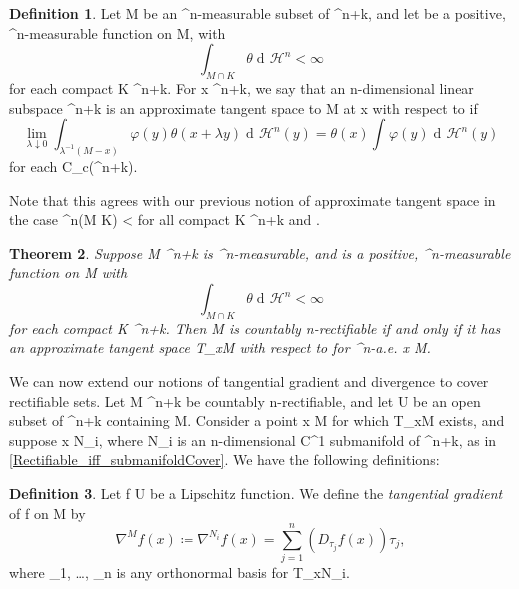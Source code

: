 \documentclass[a4paper, 11pt]{article}
\theoremstyle{plain}
\newtheorem{theorem}{Theorem}[section]
\theoremstyle{definition}
\newtheorem{definition}[theorem]{Definition}
\theoremstyle{remark}
\DeclareMathOperator{\diff}{d \!}
\numberwithin{equation}{subsection}
\def\({}
\def\){}
\def\pi{}
\begin{document}
\begin{definition}
Let \(M\) be an \(^{n}\)-measurable subset of \(^{n+k}\), and let \(\theta\) be a positive, \(^{n}\)-measurable function on \(M\), with
\begin{equation}
\int_{M \cap K} \theta \diff\mathcal{H}^{n}  < \infty
\end{equation} 
for each compact \(K \subset {}^{n+k}\). For \(x \in {}^{n+k}\), we say that an \(n\)-dimensional linear subspace \(\pi \subset {}^{n+k}\) is an approximate tangent space to \(M\) at \(x\) with respect to \(\theta\) if
\begin{equation}
\lim_{\lambda \downarrow 0} \int_{\lambda^{-1}(M-x)}\varphi(y)\theta(x + \lambda y) \diff \mathcal{H}^{n}(y) = \theta(x)\int_{\pi}\varphi(y)\diff \mathcal{H}^{n}(y)
\end{equation}
for each \(\varphi \in C_{c}(^{n+k})\).
\end{definition}

Note that this agrees with our previous notion of approximate tangent space in the case \(^{n}(M \cap K) < \infty\) for all compact \(K \subset {}^{n+k}\) and \(\theta {}\).

\begin{theorem}
\label{Rectifiable_iff_ATS_a.e._2}
Suppose \(M \subset {}^{n+k}\) is \(^{n}\)-measurable, and \(\theta\) is a positive, \(^{n}\)-measurable function on \(M\) with
\begin{equation}
\int_{M \cap K}\theta \diff\mathcal{H}^{n} < \infty
\end{equation} 
for each compact \(K \subset {}^{n+k}\). Then \(M\) is countably \(n\)-rectifiable if and only if it has an approximate tangent space \(T_{x}M\) with respect to \(\theta\) for \(^{n}\)-a.e. \(x \in M\).
\end{theorem}

We can now extend our notions of tangential gradient and divergence to cover rectifiable sets. Let \(M \subset {}^{n+k}\) be countably \(n\)-rectifiable, and let \(U\) be an open subset of \(^{n+k}\) containing \(M\). Consider a point \(x \in M\) for which \(T_{x}M\) exists, and suppose \(x \in N_{i}\), where \(N_{i}\) is an \(n\)-dimensional \(C^1\) submanifold of \(^{n+k}\), as in \cref{Rectifiable_iff_submanifoldCover}. We have the following definitions:

\begin{definition}
Let \(f \vcentcolon U \rightarrow {}\) be a Lipschitz function. We define the \emph{tangential gradient} of \(f\) on \(M\) by
\begin{equation}
\nabla^{M}f(x) \coloneq \nabla^{N_i}f(x) = \sum_{j=1}^{n}(D_{\tau_{j}}f(x))\tau_{j},
\end{equation}
where \(\tau_{1}, \ldots, \tau_{n}\) is any orthonormal basis for \(T_{x}N_{i}\).
\end{definition}
\end{document}
